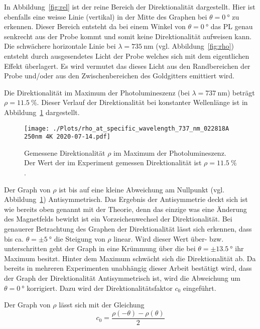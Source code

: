 In Abbildung~\ref{fig:rel} ist der reine Bereich der Direktionalität dargestellt.
Hier ist ebenfalls eine weisse Linie (vertikal) in der Mitte des Graphen bei $\theta = \SI{0}{\degree}$ zu erkennen.
Dieser Bereich entsteht da bei einem Winkel von $\theta = \SI{0}{\degree}$ das PL genau senkrecht aus der Probe kommt
und somit keine Direktionalität aufweisen kann.
Die schwächere horizontale Linie bei $\lambda = \SI{735}{\nano\meter}$ 
(vgl. Abbildung~\ref{fig:rho}) entsteht durch 
ausgesendetes Licht der Probe welches sich mit dem eigentlichen Effekt überlagert. 
Es wird vermutet das dieses Licht aus den Randbereichen der Probe und/oder aus den Zwischenbereichen des Goldgitters 
emittiert wird.

Die Direktionalität im Maximum der Photolumineszenz (bei $\lambda = \SI{737}{\nano\meter}$) beträgt
$\rho = \SI{11,5}{\percent}$. 
Dieser Verlauf der Direktionalität bei konstanter Wellenlänge ist in Abbildung~\ref{fig:dir} dargestellt.
\begin{figure}
    \centering
    \texttt{[image: ./Plots/rho\_at\_specific\_wavelength\_737\_nm\_022818A 250nm 4K 2020-07-14.pdf]}
    \caption{Gemessene Direktionalität $\rho$ im Maximum der Photolumineszenz.
    Der Wert der im Experiment gemessen Direktionalität ist $\rho = \SI{11,5}{\percent}$.}
    \label{fig:dir}
\end{figure}
\FloatBarrier

Der Graph von $\rho$ ist bis auf eine kleine Abweichung am Nullpunkt (vgl. Abbildung~\ref{fig:dir}) 
Antisymmetrisch. 
Das Ergebnis der Antisymmetrie deckt sich ist wie bereits oben genannt mit der Theorie, denn das einzige was eine
Änderung des Magnetfelds bewirkt ist ein Vorzeichenwechsel der Direktionalität.
Bei genauerer Betrachtung des Graphen der Direktionalität lässt sich erkennen, dass bis ca. $\theta = \pm \SI{5}{\degree}$
die Steigung von $\rho$ linear.
Wird dieser Wert über- bzw. unterschritten geht der Graph in eine Krümmung über die bei $\theta = \pm \SI{13,5}{\degree}$
ihr Maximum besitzt. 
Hinter dem Maximum schwächt sich die Direktionalität ab.
Da bereits in mehreren Experimenten unabhängig dieser Arbeit bestätigt wird, dass der Graph
der Direktionalität Antisymmetrisch ist, wird die Abweichung um $\theta = \SI{0}{\degree}$
korrigiert.
Dazu wird der Direktionalitätsfaktor $c_0$ eingeführt. 

Der Graph von $\rho$ lässt sich mit der Gleichung 
\begin{equation}
    c_0= \frac{\rho(-\theta)-\rho(\theta)}{2}
    \label{eq:c_0} 
\end{equation}

